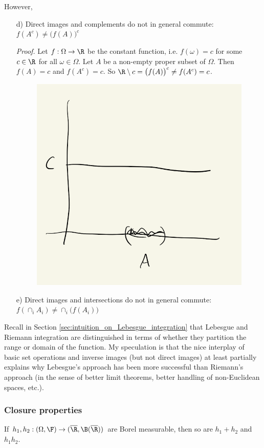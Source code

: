 \documentclass{article} %
\newif\ifActive
\begin{document}
However, 
\begin{itemize}
\item[d)] Direct images and complements do not in general commute: $f(A^c) \neq \big(f(A)\big)^c$	

\ifActive 
	\textbf{Workshop Exercise:} Prove this.
\else 
	\textit{Proof.} Let $f : \Omega \to \R$ be the constant function, i.e. $f(\omega) = c$ for some $c \in \R$ for all $\omega \in \Omega$.  Let $A$ be a non-empty proper subset of $\Omega$.  Then $f(A) = c$ and $f(A^c) = c$.  So $\R \setminus c = \big(f(A)\big)^c \neq  f(A^c) = c$.
	
	\begin{figure}[H]
	\centering
	\includegraphics[width=.25\textwidth]{images/direct_images_and_complements}	
	\end{figure}
\fi 

\item[e)] Direct images and intersections do not in general commute: $f(\cap_i A_i) \neq \cap_i \big(f(A_i)\big)$	
\end{itemize}

Recall in Section \ref{sec:intuition_on_Lebesgue_integration} that Lebesgue and Riemann integration are distinguished in terms of whether they partition the range or domain of the function.  My speculation is that the nice interplay of basic set operations and inverse images (but not direct images) at least partially explains why Lebesgue's approach has been more successful than Riemann's approach (in the sense of better limit theorems, better handling of non-Euclidean spaces, etc.).

\subsubsection{Closure properties} \label{sec:closure_properties_of_measurable_functions}

\begin{proposition}
If $h_1, h_2 : (\Omega, \F) \to (\overline{\R}, \B(\overline{\R}))$ are Borel measurable, then so are $h_1 + h_2$ and $h_1 h_2$.  
\label{prop:borel_measurability_closed_under_multiplication_and_addition}
\end{proposition}
\end{document}
